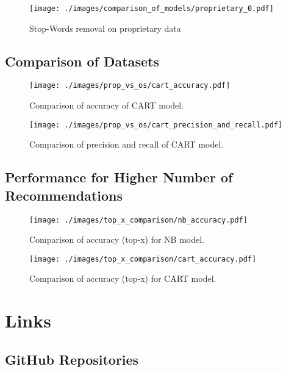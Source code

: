 \documentclass[nopalatino,nolot,nolof,color]{fithesis3}
\begin{document}
 \begin{figure}[htbp]
    \centering
        \texttt{[image: ./images/comparison\_of\_models/proprietary\_0.pdf]}
    \caption{Stop-Words removal on proprietary data}
    \label{fig:baseline.prop}
 \end{figure}

 \clearpage
 \section{Comparison of Datasets}

 \begin{figure}[htbp]
    \centering
        \texttt{[image: ./images/prop\_vs\_os/cart\_accuracy.pdf]}
    \caption{Comparison of accuracy of CART model.}
    \label{fig:results.datasets.cart_accuracy}
 \end{figure}

 \begin{figure}[htbp]
    \centering
        \texttt{[image: ./images/prop\_vs\_os/cart\_precision\_and\_recall.pdf]}
    \caption{Comparison of precision and recall of CART model.}
    \label{fig:results.datasets.cart_pr}
 \end{figure}

 \clearpage
 \section{Performance for Higher Number of Recommendations}

 \begin{figure}[htbp]
    \centering
        \texttt{[image: ./images/top\_x\_comparison/nb\_accuracy.pdf]}
    \caption{Comparison of accuracy (top-x) for NB model.}
    \label{fig:results.topx.nb_accuracy}
 \end{figure}

 \begin{figure}[htbp]
    \centering
        \texttt{[image: ./images/top\_x\_comparison/cart\_accuracy.pdf]}
    \caption{Comparison of accuracy (top-x) for CART model.}
    \label{fig:results.topx.cart_accuracy}
 \end{figure}

 \chapter{Links}
 \label{appendix:links}

 \section{GitHub Repositories}
\end{document}
